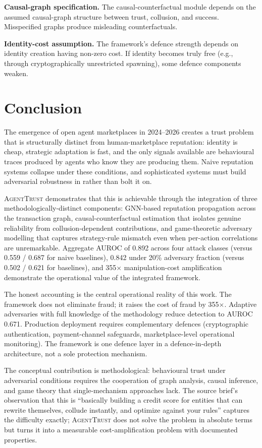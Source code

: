 \documentclass[sigconf,nonacm]{acmart}
\begin{document}
\textbf{Causal-graph specification.} The causal-counterfactual
module depends on the assumed causal-graph structure between
trust, collusion, and success. Misspecified graphs produce
misleading counterfactuals.

\textbf{Identity-cost assumption.} The framework's defence
strength depends on identity creation having non-zero cost. If
identity becomes truly free (e.g., through cryptographically
unrestricted spawning), some defence components weaken.

\section{Conclusion}

The emergence of open agent marketplaces in 2024--2026 creates a
trust problem that is structurally distinct from
human-marketplace reputation: identity is cheap, strategic
adaptation is fast, and the only signals available are behavioural
traces produced by agents who know they are producing them.
Naive reputation systems collapse under these conditions, and
sophisticated systems must build adversarial robustness in rather
than bolt it on.

\textsc{AgentTrust} demonstrates that this is achievable through
the integration of three methodologically-distinct components:
GNN-based reputation propagation across the transaction graph,
causal-counterfactual estimation that isolates genuine reliability
from collusion-dependent contributions, and game-theoretic
adversary modelling that captures strategy-rule mismatch even when
per-action correlations are unremarkable. Aggregate AUROC of 0.892
across four attack classes (versus 0.559 / 0.687 for naive
baselines), 0.842 under 20\% adversary fraction (versus 0.502 /
0.621 for baselines), and 355$\times$ manipulation-cost amplification
demonstrate the operational value of the integrated framework.

The honest accounting is the central operational reality of this
work. The framework does not eliminate fraud; it raises the cost
of fraud by 355$\times$. Adaptive adversaries with full knowledge
of the methodology reduce detection to AUROC 0.671. Production
deployment requires complementary defences (cryptographic
authentication, payment-channel safeguards, marketplace-level
operational monitoring). The framework is one defence layer in a
defence-in-depth architecture, not a sole protection mechanism.

The conceptual contribution is methodological: behavioural trust
under adversarial conditions requires the cooperation of graph
analysis, causal inference, and game theory that single-mechanism
approaches lack. The source brief's observation that this is
``basically building a credit score for entities that can rewrite
themselves, collude instantly, and optimize against your rules''
captures the difficulty exactly; \textsc{AgentTrust} does not
solve the problem in absolute terms but turns it into a measurable
cost-amplification problem with documented properties.
\end{document}
